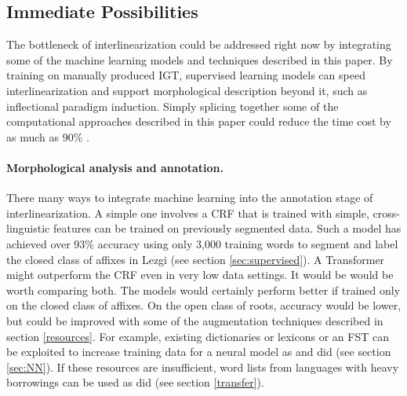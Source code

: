 \documentclass[12pt]{article}
\begin{document}
\subsection{Immediate Possibilities}
\label{sec:splicing}

The bottleneck of interlinearization could be addressed right now by integrating some of the machine learning models and techniques described in this paper. By training on manually produced IGT, supervised learning models can speed interlinearization and support morphological description beyond it, such as inflectional paradigm induction. Simply splicing together some of the computational approaches described in this paper could reduce the time cost by as much as 90\% \cite{felt_improving_2012,moeller_automatic_2018}.  

\paragraph{Morphological analysis and annotation.} There many ways to integrate machine learning into the annotation stage of interlinearization. A simple one involves a CRF that is trained with simple, cross-linguistic features can be trained on previously segmented data. Such a model has achieved over 93\% accuracy using only 3,000 training words to segment and label the closed class of affixes in Lezgi \cite{moeller_automatic_2018} (see section \ref{sec:supervised}). A Transformer might outperform the CRF even in very low data settings. It would be would be worth comparing both. The models would certainly perform better if trained only on the closed class of affixes. On the open class of roots, accuracy would be lower, but could be improved with some of the augmentation techniques described in section \ref{resources}. For example, existing dictionaries or lexicons or an FST can be exploited to increase training data for a neural model as 
 and  did (see section \ref{sec:NN}). If these resources are insufficient, word lists from languages with heavy borrowings can be used as  did (see section \ref{transfer}). 
\end{document}
